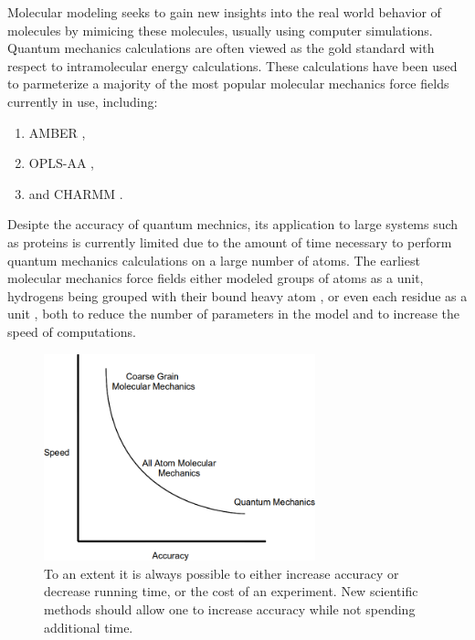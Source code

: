 Molecular modeling seeks to gain new insights into the real world behavior of molecules by mimicing these molecules, usually using computer simulations.
Quantum mechanics calculations are often viewed as the gold standard with respect to intramolecular energy calculations.
These calculations have been used to parmeterize a majority of the most popular molecular mechanics force fields currently in use, including:
\begin{enumerate}
\item AMBER \cite{weiner1984new},
\item OPLS-AA \cite{kaminski1994free},
\item and CHARMM \cite{mackerell2002charmm}.
\end{enumerate}
Desipte the accuracy of quantum mechnics, its application to large systems such as proteins is currently limited due to the amount of time necessary to perform quantum mechanics calculations on a large number of atoms.
The earliest molecular mechanics force fields either modeled groups of atoms as a unit, hydrogens being grouped with their bound heavy atom \cite{jorgensen1988opls}, or even each residue as a unit \cite{lee1999energy}, both to reduce the number of parameters in the model and to increase the speed of computations.

\begin{figure}[h]
\begin{center}
\includegraphics[width=0.7\textwidth]{figures/conservation_of_annoyance.png}
\caption{To an extent it is always possible to either increase accuracy or decrease running time, or the cost of an experiment.
New scientific methods should allow one to increase accuracy while not spending additional time.}
\label{figure:pdb_growth}
\end{center}
\end{figure}

